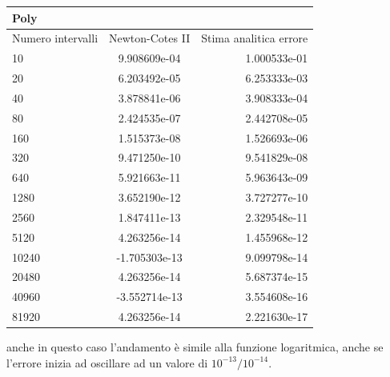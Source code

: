 \begin{center}
\begin{longtable}[h]{lcr}
\toprule
Poly & & \\
\midrule
Numero intervalli & Newton-Cotes II & Stima analitica errore  \\
\midrule
10 & 	  9.908609e-04 & 	  1.000533e-01 \\  
20 & 	  6.203492e-05 & 	  6.253333e-03 \\  
40 & 	  3.878841e-06 & 	  3.908333e-04 \\  
80 & 	  2.424535e-07 & 	  2.442708e-05 \\  
160 & 	  1.515373e-08 & 	  1.526693e-06 \\  
320 & 	  9.471250e-10 & 	  9.541829e-08 \\  
640 & 	  5.921663e-11 & 	  5.963643e-09 \\  
1280 & 	  3.652190e-12 & 	  3.727277e-10 \\  
2560 & 	  1.847411e-13 & 	  2.329548e-11 \\  
5120 & 	  4.263256e-14 & 	  1.455968e-12 \\  
10240 & -1.705303e-13  	 & 9.099798e-14 \\  
20480 & 4.263256e-14  	 & 5.687374e-15 \\  
40960 & -3.552714e-13 	 & 3.554608e-16 \\  
81920 & 4.263256e-14  	 & 2.221630e-17 \\  

\bottomrule
\end{longtable}
\end{center}
anche in questo caso l'andamento è simile alla funzione logaritmica, anche se l'errore inizia ad oscillare ad un valore di $10^{-13}/10^{-14}$.  
